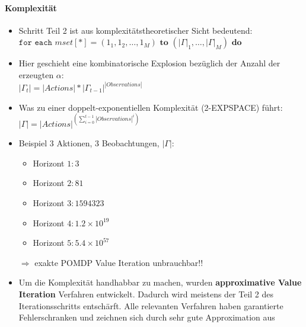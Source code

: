 \paragraph{Komplexit\"at}
\begin{itemize}
	\item Schritt Teil 2 ist aus komplexit\"atstheoretischer Sicht bedeutend:\\
	$\texttt{for each } mset\left[*\right] = (1_1, 1_2, \ldots, 1_M) \textbf{ to } (|\Gamma|_1, \ldots, |\Gamma|_M) \textbf{ do}$
	\item Hier geschieht eine kombinatorische Explosion bez\"uglich der Anzahl der erzeugten $\alpha$:\\
	$|\Gamma_t| = |Actions| * |\Gamma_{t-1}|^{|Observations|}$
	\item Was zu einer doppelt-exponentiellen Komplexit\"at (2-EXPSPACE) f\"uhrt:\\
	$|\Gamma| = |Actions|^{(\sum_{i=0}^{t-1} |Observations|^i)}$
	\newpage
	\item Beispiel 3 Aktionen, 3 Beobachtungen, $|\Gamma|$:
	\begin{itemize}
		\item Horizont $1:3$
		\item Horizont $2:81$
		\item Horizont $3:1594323$ 
		\item Horizont $4:1.2 \times 10^19$
		\item Horizont $5:5.4 \times 10^57$
	\end{itemize}
	\item[$\Rightarrow$] exakte POMDP Value Iteration unbrauchbar!!
	\item Um die Komplexit\"at handhabbar zu machen, wurden \textbf{approximative Value Iteration} Verfahren entwickelt. Dadurch wird meistens der Teil 2 des Iterationsschritts entsch\"arft. Alle relevanten Verfahren haben garantierte Fehlerschranken und zeichnen sich durch sehr gute Approximation aus
\end{itemize}

